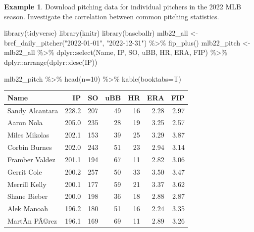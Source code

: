 \documentclass[
  11pt,
]{book}
\newenvironment{Shaded}{\begin{snugshade}}{\end{snugshade}}
\newcommand{\AttributeTok}[1]{\textcolor[rgb]{0.77,0.63,0.00}{#1}}
\newcommand{\DecValTok}[1]{\textcolor[rgb]{0.00,0.00,0.81}{#1}}
\newcommand{\FunctionTok}[1]{\textcolor[rgb]{0.00,0.00,0.00}{#1}}
\newcommand{\NormalTok}[1]{#1}
\newcommand{\OtherTok}[1]{\textcolor[rgb]{0.56,0.35,0.01}{#1}}
\newcommand{\SpecialCharTok}[1]{\textcolor[rgb]{0.00,0.00,0.00}{#1}}
\newcommand{\StringTok}[1]{\textcolor[rgb]{0.31,0.60,0.02}{#1}}
\theoremstyle{definition}
\theoremstyle{definition}
\newtheorem{example}{Example}[chapter]
\theoremstyle{definition}
\theoremstyle{definition}
\theoremstyle{remark}
\begin{document}
\begin{example}
Download pitching data for individual pitchers in the 2022 MLB season. Investigate the correlation between common pitching statistics.
\end{example}

\begin{Shaded}
\begin{Highlighting}[]
\FunctionTok{library}\NormalTok{(tidyverse)}
\FunctionTok{library}\NormalTok{(knitr)}
\FunctionTok{library}\NormalTok{(baseballr)}
\NormalTok{mlb22\_all }\OtherTok{\textless{}{-}} \FunctionTok{bref\_daily\_pitcher}\NormalTok{(}\StringTok{"2022{-}01{-}01"}\NormalTok{, }\StringTok{"2022{-}12{-}31"}\NormalTok{) }\SpecialCharTok{\%\textgreater{}\%} 
  \FunctionTok{fip\_plus}\NormalTok{()}
\NormalTok{mlb22\_pitch }\OtherTok{\textless{}{-}}\NormalTok{ mlb22\_all }\SpecialCharTok{\%\textgreater{}\%}  
\NormalTok{  dplyr}\SpecialCharTok{::}\FunctionTok{select}\NormalTok{(Name, IP, SO, uBB, HR, ERA, FIP) }\SpecialCharTok{\%\textgreater{}\%}
\NormalTok{  dplyr}\SpecialCharTok{::}\FunctionTok{arrange}\NormalTok{(dplyr}\SpecialCharTok{::}\FunctionTok{desc}\NormalTok{(IP))}

\NormalTok{mlb22\_pitch }\SpecialCharTok{\%\textgreater{}\%} 
  \FunctionTok{head}\NormalTok{(}\AttributeTok{n=}\DecValTok{10}\NormalTok{) }\SpecialCharTok{\%\textgreater{}\%}
  \FunctionTok{kable}\NormalTok{(}\AttributeTok{booktabs=}\NormalTok{T)}
\end{Highlighting}
\end{Shaded}

\begin{tabular}{lrrrrrr}
\toprule
Name & IP & SO & uBB & HR & ERA & FIP\\
\midrule
Sandy Alcantara & 228.2 & 207 & 49 & 16 & 2.28 & 2.97\\
Aaron Nola & 205.0 & 235 & 28 & 19 & 3.25 & 2.57\\
Miles Mikolas & 202.1 & 153 & 39 & 25 & 3.29 & 3.87\\
Corbin Burnes & 202.0 & 243 & 51 & 23 & 2.94 & 3.14\\
Framber Valdez & 201.1 & 194 & 67 & 11 & 2.82 & 3.06\\
\addlinespace
Gerrit Cole & 200.2 & 257 & 50 & 33 & 3.50 & 3.47\\
Merrill Kelly & 200.1 & 177 & 59 & 21 & 3.37 & 3.62\\
Shane Bieber & 200.0 & 198 & 36 & 18 & 2.88 & 2.87\\
Alek Manoah & 196.2 & 180 & 51 & 16 & 2.24 & 3.35\\
MartÃ­n PÃ©rez & 196.1 & 169 & 69 & 11 & 2.89 & 3.26\\
\bottomrule
\end{tabular}
\end{document}
